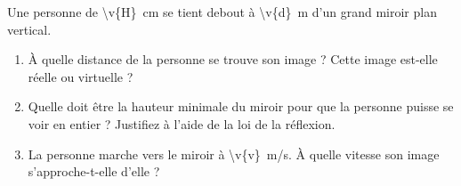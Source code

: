 Une personne de \qty{\v{H}}{cm} se tient debout à \qty{\v{d}}{m} d'un grand miroir plan vertical.

\begin{enumerate}[label=\alph*)]
    \item À quelle distance de la personne se trouve son image ? Cette image est-elle réelle ou virtuelle ?
    \item Quelle doit être la hauteur minimale du miroir pour que la personne puisse se voir en entier ? Justifiez à l'aide de la loi de la réflexion.
    \item La personne marche vers le miroir à \qty{\v{v}}{m/s}. À quelle vitesse son image s'approche-t-elle d'elle ?
\end{enumerate}

